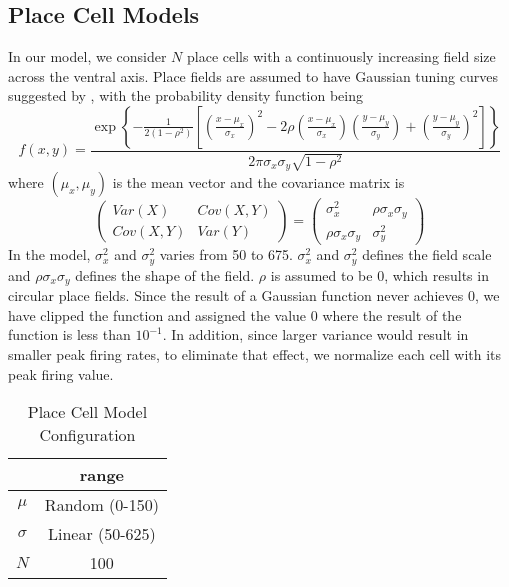\documentclass[11pt, letterpaper, onecolumn]{article}
\begin{document}
\subsection{Place Cell Models}
In our model, we consider $N$ place cells with a continuously increasing field size across the ventral axis. Place fields are assumed to have Gaussian tuning curves suggested by \cite{OKeefe:Geometric96}, with the probability density function being
\begin{equation}
\label{eq:placeprob}
f(x,y)=\frac{\exp \left\{ -\frac 1{2(1-\rho ^2)}\left[ \left( \frac{x-\mu _x%
}{\sigma _x}\right) ^2-2\rho \left( \frac{x-\mu _x}{\sigma _x}\right) \left( 
\frac{y-\mu _y}{\sigma _y}\right) +\left( \frac{y-\mu _y}{\sigma _y}\right)
^2\right] \right\} }{2\pi \sigma _x\sigma _y\sqrt{1-\rho ^2}} 
\end{equation}
where $(\mu _x,\mu _y)$ is the mean vector and the covariance matrix is
\begin{equation}
\left( 
\begin{array}{cc}
Var(X) & Cov(X,Y) \\ 
Cov(X,Y) & Var(Y)
\end{array}
\right) =\left( 
\begin{array}{cc}
\sigma _x^2 & \rho \sigma _x\sigma _y \\ 
\rho \sigma _x\sigma _y & \sigma _y^2
\end{array}
\right) 
\end{equation}
In the model, $ \sigma _x^2 $ and $ \sigma _y^2 $ varies from 50 to 675. $ \sigma _x^2 $ and $ \sigma _y^2 $ defines the field scale and $ \rho \sigma _x\sigma _y $ defines the shape of the field. $ \rho $ is assumed to be 0, which results in circular place fields. Since the result of a Gaussian function never achieves 0, we have clipped the function and assigned the value 0 where the result of the function is less than $ 10^{-1} $. In addition, since larger variance would result in smaller peak firing rates, to eliminate that effect, we normalize each cell with its peak firing value.

\begin{table}[h]
\centering
\caption{Place Cell Model Configuration}
\label{lb:place}
\begin{tabular}{c|c}
\hline
       & range     \\ \hline
$\mu$  & Random (0-150)      \\ \hline
$\sigma$ &  Linear (50-625) \\ \hline
$ N $ & 100 \\ \hline
\end{tabular}
\end{table}
\end{document}
